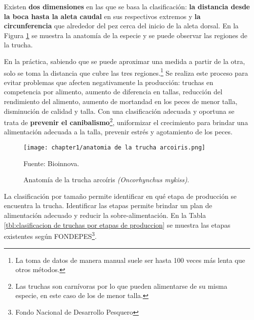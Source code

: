 Existen \textbf{dos dimensiones} en las que se basa la clasificación: \textbf{la distancia desde la boca hasta la aleta caudal} en sus respectivos extremos y \textbf{la circunferencia} que alrededor del pez cerca del inicio de la aleta dorsal. En la Figura \ref{fig:anatomia de la trucha arcoiris} se muestra la anatomía de la especie y se puede observar las regiones de la trucha.

En la práctica, sabiendo que se puede aproximar una medida a partir de la otra, solo se toma la distancia que cubre las tres regiones.\footnote{La toma de datos de manera manual suele ser hasta 100 veces más lenta que otros métodos.} Se realiza este proceso para evitar problemas que afecten negativamente la producción: truchas en competencia por alimento, aumento de diferencia en tallas, reducción del rendimiento del alimento, aumento de mortandad en los peces de menor talla, disminución de calidad y talla. Con una clasificación adecuada y oportuna se trata de \textbf{prevenir el canibalismo}\footnote{Las truchas son carnívoras por lo que pueden alimentarse de su misma especie, en este caso de los de menor talla.}, uniformizar el crecimiento para brindar una alimentación adecuada a la talla, prevenir estrés y agotamiento de los peces.\citep[p.~16]{Flores2010} 

\begin{figure}[H]
	\centering
	\texttt{[image: chapter1/anatomia de la trucha arcoiris.png]}
	\caption{Anatomía de la trucha arcoíris \textit{(Oncorhynchus mykiss)}.}
	\begin{myflushleftportland}
		Fuente: Bioinnova.
	\end{myflushleftportland}	
	\label{fig:anatomia de la trucha arcoiris}
\end{figure}


La clasificación por tamaño permite identificar en qué etapa de producción se encuentra la trucha. Identificar las etapas permite brindar un plan de alimentación adecuado y reducir la sobre-alimentación. En la Tabla \ref{tbl:clasificacion de truchas por etapas de produccion} se muestra las etapas existentes según FONDEPES\footnote{Fondo Nacional de Desarrollo Pesquero}.
 
